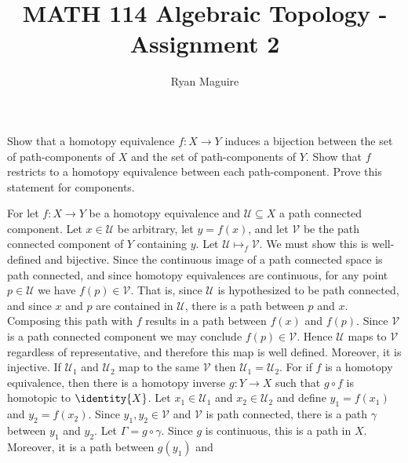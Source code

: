 \documentclass{article}                                                        %
\begin{document}
    \title{MATH 114 Algebraic Topology - Assignment 2}
    \author{Ryan Maguire}
    \date{\vspace{-5ex}}
    \maketitle
    \setcounter{section}{1}
    \begin{problem}
        Show that a homotopy equivalence $f:X\rightarrow{Y}$ induces a bijection
        between the set of path-components of $X$ and the set of path-components
        of $Y$. Show that $f$ restricts to a homotopy equivalence between each
        path-component. Prove this statement for components.
    \end{problem}
    \begin{solution}
        For let $f:X\rightarrow{Y}$ be a homotopy equivalence and
        $\mathcal{U}\subseteq{X}$ a path connected component. Let
        $x\in\mathcal{U}$ be arbitrary, let $y=f(x)$, and let $\mathcal{V}$ be
        the path connected component of $Y$ containing $y$. Let
        $\mathcal{U}\mapsto_{f}\mathcal{V}$. We must show this is well-defined
        and bijective. Since the continuous image of a path connected space is
        path connected, and since homotopy equivalences are continuous, for any
        point $p\in\mathcal{U}$ we have $f(p)\in\mathcal{V}$. That is, since
        $\mathcal{U}$ is hypothesized to be path connected, and since $x$ and
        $p$ are contained in $\mathcal{U}$, there is a path between $p$ and $x$.
        Composing this path with $f$ results in a path between $f(x)$ and
        $f(p)$. Since $\mathcal{V}$ is a path connected component we may
        conclude $f(p)\in\mathcal{V}$. Hence $\mathcal{U}$ maps to $\mathcal{V}$
        regardless of representative, and therefore this map is well defined.
        Moreover, it is injective. If
        $\mathcal{U}_{1}$ and $\mathcal{U}_{2}$ map to the same $\mathcal{V}$
        then $\mathcal{U}_{1}=\mathcal{U}_{2}$. For if $f$ is a homotopy
        equivalence, then there is a homotopy inverse $g:Y\rightarrow{X}$ such
        that $g\circ{f}$ is homotopic to $\identity{X}$. Let
        $x_{1}\in\mathcal{U}_{1}$ and $x_{2}\in\mathcal{U}_{2}$ and define
        $y_{1}=f(x_{1})$ and $y_{2}=f(x_{2})$. Since $y_{1},y_{2}\in\mathcal{V}$
        and $\mathcal{V}$ is path connected, there is a path $\gamma$ between
        $y_{1}$ and $y_{2}$. Let $\Gamma=g\circ\gamma$. Since $g$ is continuous,
        this is a path in $X$. Moreover, it is a path between $g(y_{1})$ and

\end{solution}
\end{document}
